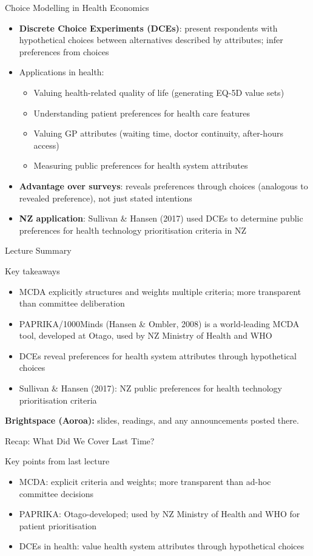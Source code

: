 \documentclass[aspectratio=169, 12pt]{beamer}
\newcommand{\recapslide}[1]{%
  \begin{frame}{Recap: What Did We Cover Last Time?}
    \begin{block}{Key points from last lecture}
      \begin{itemize}#1\end{itemize}
    \end{block}
  \end{frame}}
\newcommand{\summaryside}[1]{%
  \begin{frame}{Lecture Summary}
    \begin{exampleblock}{Key takeaways}
      \begin{itemize}#1\end{itemize}
    \end{exampleblock}
    \vspace{0.5em}
    {\footnotesize\textcolor{OtagoGold}{\textbf{Brightspace (Aoroa):}} slides, readings, and any announcements posted there.}
  \end{frame}}
\begin{document}
\begin{frame}{Choice Modelling in Health Economics}
  \begin{itemize}
    \item \textbf{Discrete Choice Experiments (DCEs)}: present respondents with hypothetical
          choices between alternatives described by attributes; infer preferences from choices
    \item Applications in health:
    \begin{itemize}
      \item Valuing health-related quality of life (generating EQ-5D value sets)
      \item Understanding patient preferences for health care features
      \item Valuing GP attributes (waiting time, doctor continuity, after-hours access)
      \item Measuring public preferences for health system attributes
    \end{itemize}
    \item \textbf{Advantage over surveys}: reveals preferences through choices (analogous
          to revealed preference), not just stated intentions
    \item \textbf{NZ application}: Sullivan \& Hansen (2017) used DCEs to determine
          public preferences for health technology prioritisation criteria in NZ
  \end{itemize}
\end{frame}

\summaryside{
  \item MCDA explicitly structures and weights multiple criteria; more transparent than committee deliberation
  \item PAPRIKA/1000Minds (Hansen \& Ombler, 2008) is a world-leading MCDA tool, developed at Otago, used by NZ Ministry of Health and WHO
  \item DCEs reveal preferences for health system attributes through hypothetical choices
  \item Sullivan \& Hansen (2017): NZ public preferences for health technology prioritisation criteria
}

\recapslide{
  \item MCDA: explicit criteria and weights; more transparent than ad-hoc committee decisions
  \item PAPRIKA: Otago-developed; used by NZ Ministry of Health and WHO for patient prioritisation
  \item DCEs in health: value health system attributes through hypothetical choices
}
\end{document}
